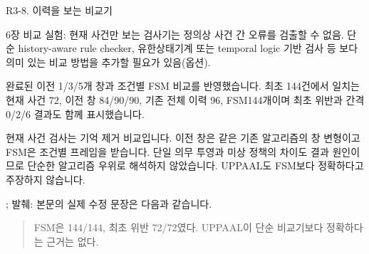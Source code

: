 \clearpage

\begin{reviewitem}{R3-8. 이력을 보는 비교기}

\begin{reviewercomment}

6장 비교 실험: 현재 사건만 보는 검사기는 정의상 사건 간 오류를 검출할 수 없음. 단순 history-aware rule checker, 유한상태기계 또는 temporal logic 기반 검사 등 보다 의미 있는 비교 방법을 추가할 필요가 있음(옵션).

\end{reviewercomment}

\begin{authorresponse}

완료된 이전 1/3/5개 창과 조건별 FSM 비교를 반영했습니다. 최초 144건에서 일치는 현재 사건 72, 이전 창 84/90/90, 기존 전체 이력 96, FSM144개이며 최초 위반과 간격 0/2/6 결과도 함께 표시했습니다.

현재 사건 검사는 기억 제거 비교입니다. 이전 창은 같은 기존 알고리즘의 창 변형이고 FSM은 조건별 프레임을 받습니다. 단일 의무 투영과 미상 정책의 차이도 결과 원인이므로 단순한 알고리즘 우위로 해석하지 않았습니다. UPPAAL도 FSM보다 정확하다고 주장하지 않습니다.

\end{authorresponse}

\begin{manuscriptrevision}{; 발췌: }
본문의 실제 수정 문장은 다음과 같습니다.

\begin{quote}
FSM은 144/144, 최초 위반 72/72였다. UPPAAL이 단순 비교기보다 정확하다는 근거는 없다.
\end{quote}
\end{manuscriptrevision}

\end{reviewitem}

\clearpage

